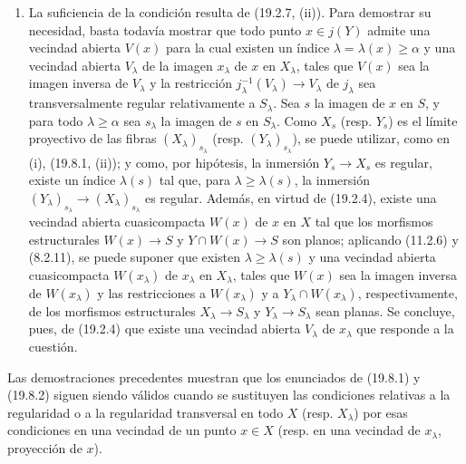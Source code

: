 \begin{enumerate}
  \item[(ii)] La suficiencia de la condición resulta de (19.2.7, (ii)). Para demostrar su necesidad, basta todavía mostrar que todo punto $x\in j(Y)$ admite una vecindad abierta $V(x)$ para la cual existen un índice $\lambda=\lambda(x)\geq\alpha$ y una vecindad abierta $V_\lambda$ de la imagen $x_\lambda$ de $x$ en $X_\lambda$, tales que $V(x)$ sea la imagen inversa de $V_\lambda$ y la restricción $j_\lambda^{-1}(V_\lambda)\to V_\lambda$ de $j_\lambda$ sea transversalmente regular relativamente a $S_\lambda$. Sea $s$ la imagen de $x$ en $S$, y para todo $\lambda\geq\alpha$ sea $s_\lambda$ la imagen de $s$ en $S_\lambda$. Como $X_s$ (resp. $Y_s$) es el límite proyectivo de las fibras $(X_\lambda)_{s_\lambda}$ (resp. $(Y_\lambda)_{s_\lambda}$), se puede utilizar, como en (i), (19.8.1, (ii)); y como, por hipótesis, la inmersión $Y_s\to X_s$ es regular, existe un índice $\lambda(s)$ tal que, para $\lambda\geq\lambda(s)$, la inmersión $(Y_\lambda)_{s_\lambda}\to(X_\lambda)_{s_\lambda}$ es regular. Además, en virtud de (19.2.4), existe una vecindad abierta cuasicompacta $W(x)$ de $x$ en $X$ tal que los morfismos estructurales $W(x)\to S$ y $Y\cap W(x)\to S$ son planos; aplicando (11.2.6) y (8.2.11), se puede suponer que existen $\lambda\geq\lambda(s)$ y una vecindad abierta cuasicompacta $W(x_\lambda)$ de $x_\lambda$ en $X_\lambda$, tales que $W(x)$ sea la imagen inversa de $W(x_\lambda)$ y las restricciones a $W(x_\lambda)$ y a $Y_\lambda\cap W(x_\lambda)$, respectivamente, de los morfismos estructurales $X_\lambda\to S_\lambda$ y $Y_\lambda\to S_\lambda$ sean planas. Se concluye, pues, de (19.2.4) que existe una vecindad abierta $V_\lambda$ de $x_\lambda$ que responde a la cuestión.
\end{enumerate}

\begin{remark}[19.8.3]
\label{IV.19.8.3}
Las demostraciones precedentes muestran que los enunciados de (19.8.1) y (19.8.2) siguen siendo válidos cuando se sustituyen las condiciones relativas a la regularidad o a la regularidad transversal en todo $X$ (resp. $X_\lambda$) por esas condiciones en una vecindad de un punto $x\in X$ (resp. en una vecindad de $x_\lambda$, proyección de $x$).
\end{remark}
